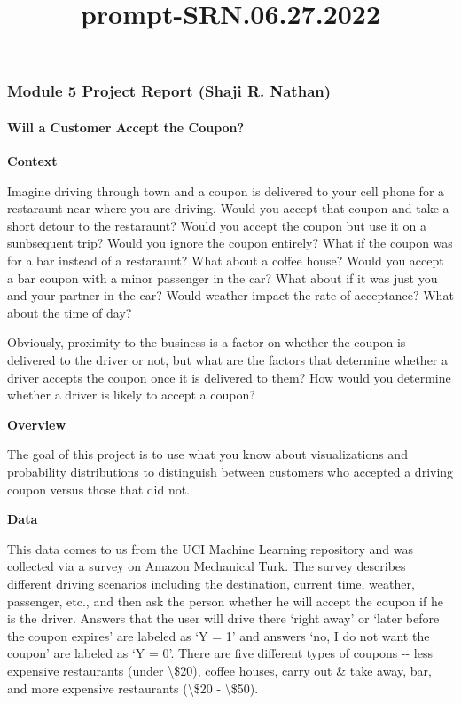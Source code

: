 \documentclass[11pt]{article}
\title{prompt-SRN.06.27.2022}
\begin{document}
    
    
    \maketitle
    
    

    
    \subsubsection{Module 5 Project Report (Shaji R.
Nathan)}\label{module-5-project-report-shaji-r.-nathan}

\paragraph{Will a Customer Accept the
Coupon?}\label{will-a-customer-accept-the-coupon}

\textbf{Context}

Imagine driving through town and a coupon is delivered to your cell
phone for a restaraunt near where you are driving. Would you accept that
coupon and take a short detour to the restaraunt? Would you accept the
coupon but use it on a sunbsequent trip? Would you ignore the coupon
entirely? What if the coupon was for a bar instead of a restaraunt? What
about a coffee house? Would you accept a bar coupon with a minor
passenger in the car? What about if it was just you and your partner in
the car? Would weather impact the rate of acceptance? What about the
time of day?

Obviously, proximity to the business is a factor on whether the coupon
is delivered to the driver or not, but what are the factors that
determine whether a driver accepts the coupon once it is delivered to
them? How would you determine whether a driver is likely to accept a
coupon?

\textbf{Overview}

The goal of this project is to use what you know about visualizations
and probability distributions to distinguish between customers who
accepted a driving coupon versus those that did not.

\textbf{Data}

This data comes to us from the UCI Machine Learning repository and was
collected via a survey on Amazon Mechanical Turk. The survey describes
different driving scenarios including the destination, current time,
weather, passenger, etc., and then ask the person whether he will accept
the coupon if he is the driver. Answers that the user will drive there
`right away' or `later before the coupon expires' are labeled as `Y = 1'
and answers `no, I do not want the coupon' are labeled as `Y = 0'. There
are five different types of coupons -\/- less expensive restaurants
(under \textbackslash{}\$20), coffee houses, carry out \& take away,
bar, and more expensive restaurants (\textbackslash{}\$20 -
\textbackslash{}\$50).
\end{document}
